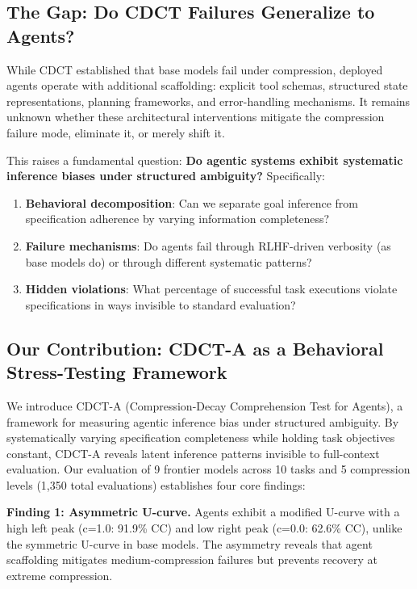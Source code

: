 \documentclass[11pt]{article}
\begin{document}
\subsection{The Gap: Do CDCT Failures Generalize to Agents?}

While CDCT established that base models fail under compression, deployed agents operate with additional scaffolding: explicit tool schemas, structured state representations, planning frameworks, and error-handling mechanisms. It remains unknown whether these architectural interventions mitigate the compression failure mode, eliminate it, or merely shift it.

This raises a fundamental question: \textbf{Do agentic systems exhibit systematic inference biases under structured ambiguity?} Specifically:

\begin{enumerate}
\item \textbf{Behavioral decomposition}: Can we separate goal inference from specification adherence by varying information completeness?
\item \textbf{Failure mechanisms}: Do agents fail through RLHF-driven verbosity (as base models do) or through different systematic patterns?
\item \textbf{Hidden violations}: What percentage of successful task executions violate specifications in ways invisible to standard evaluation?
\end{enumerate}

\subsection{Our Contribution: CDCT-A as a Behavioral Stress-Testing Framework}

We introduce CDCT-A (Compression-Decay Comprehension Test for Agents), a framework for measuring agentic inference bias under structured ambiguity. By systematically varying specification completeness while holding task objectives constant, CDCT-A reveals latent inference patterns invisible to full-context evaluation. Our evaluation of 9 frontier models across 10 tasks and 5 compression levels (1,350 total evaluations) establishes four core findings:

\textbf{Finding 1: Asymmetric U-curve.} Agents exhibit a modified U-curve with a high left peak (c=1.0: 91.9\% CC) and low right peak (c=0.0: 62.6\% CC), unlike the symmetric U-curve in base models. The asymmetry reveals that agent scaffolding mitigates medium-compression failures but prevents recovery at extreme compression.
\end{document}
